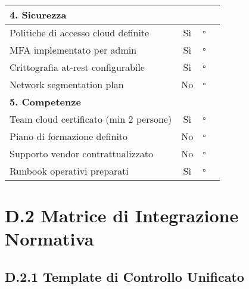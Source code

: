 \begin{table}[htbp]
\begin{tabular}{|p{6cm}|c|c|p{4cm}|}
\hline
\multicolumn{4}{|l|}{\textbf{4. Sicurezza}} \\
\hline
Politiche di accesso cloud definite & Sì & $\square$ & \\
\hline
MFA implementato per admin & Sì & $\square$ & \\
\hline
Crittografia at-rest configurabile & Sì & $\square$ & \\
\hline
Network segmentation plan & No & $\square$ & \\
\hline
\multicolumn{4}{|l|}{\textbf{5. Competenze}} \\
\hline
Team cloud certificato (min 2 persone) & Sì & $\square$ & \\
\hline
Piano di formazione definito & No & $\square$ & \\
\hline
Supporto vendor contrattualizzato & No & $\square$ & \\
\hline
Runbook operativi preparati & Sì & $\square$ & \\
\hline
\end{tabular}
\end{table}

\section{D.2 Matrice di Integrazione Normativa}

\subsection{D.2.1 Template di Controllo Unificato}

